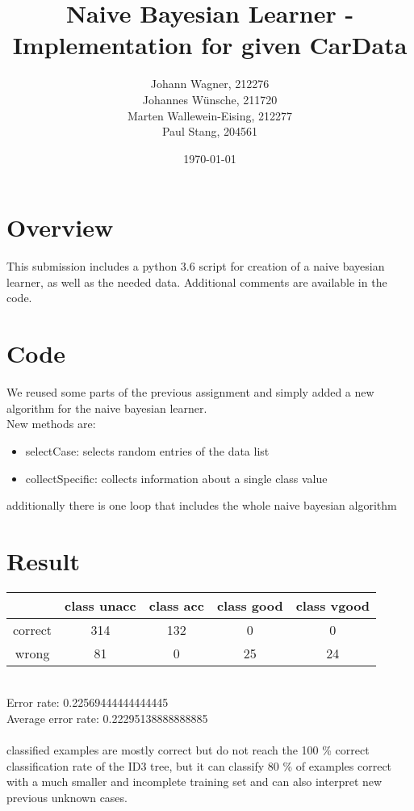 \documentclass{article}
\begin{document}
\title{Naive Bayesian Learner - Implementation for given CarData}
\author{Johann Wagner, 212276 \\ Johannes Wünsche, 211720 \\ Marten Wallewein-Eising, 212277 \\ Paul Stang, 204561}
\date{\today}
\maketitle

\section*{Overview}
This submission includes a python 3.6 script for creation of a naive bayesian learner, as well as the needed data. Additional comments are available in the code.

\section*{Code}
We reused some parts of the previous assignment and simply added a new algorithm for the naive bayesian learner.\\
New methods are:
\begin{itemize}
\item selectCase: selects random entries of the data list
\item collectSpecific: collects information about a single class value
\end{itemize}
additionally there is one loop that includes the whole naive bayesian algorithm

\section*{Result}
\begin{tabular}{c c c c c}
& class unacc & class acc & class good & class vgood \\ \hline
correct & 314 & 132 & 0 & 0 \\
wrong & 81 & 0 & 25 & 24 \\ \hline
\end{tabular}\\
Error rate: 0.22569444444444445\\
Average error rate: 0.22295138888888885 \\\\
classified examples are mostly correct but do not reach the 100 \% correct classification rate of the ID3 tree, but it can classify 80 \% of examples correct with a much smaller and incomplete training set and can also interpret new previous unknown cases.
\end{document}
